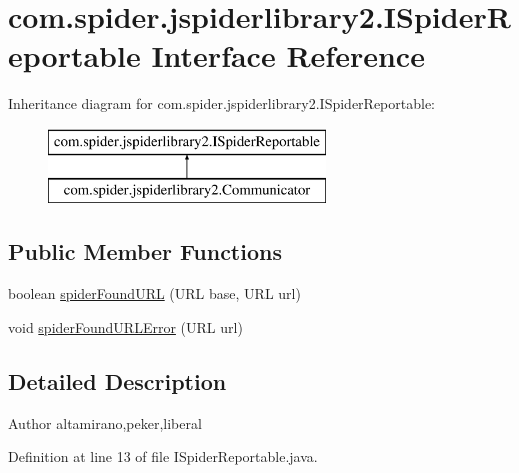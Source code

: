 \hypertarget{interfacecom_1_1spider_1_1jspiderlibrary2_1_1_i_spider_reportable}{\section{com.\-spider.\-jspiderlibrary2.\-I\-Spider\-Reportable \-Interface \-Reference}
\label{interfacecom_1_1spider_1_1jspiderlibrary2_1_1_i_spider_reportable}
}
\-Inheritance diagram for com.\-spider.\-jspiderlibrary2.\-I\-Spider\-Reportable\-:\begin{figure}[H]
\begin{center}
\leavevmode
\includegraphics[height=2.000000cm]{interfacecom_1_1spider_1_1jspiderlibrary2_1_1_i_spider_reportable}
\end{center}
\end{figure}
\subsection*{\-Public \-Member \-Functions}
\begin{DoxyCompactItemize}
\item 
boolean \hyperlink{interfacecom_1_1spider_1_1jspiderlibrary2_1_1_i_spider_reportable_a10fe4e486e6bd29efaa481e7532a84e3}{spider\-Found\-U\-R\-L} (\-U\-R\-L base, \-U\-R\-L url)
\item 
void \hyperlink{interfacecom_1_1spider_1_1jspiderlibrary2_1_1_i_spider_reportable_a73e089019826aba4f610eaa4974e6ad8}{spider\-Found\-U\-R\-L\-Error} (\-U\-R\-L url)
\end{DoxyCompactItemize}


\subsection{\-Detailed \-Description}
\begin{DoxyAuthor}{\-Author}
altamirano,peker,liberal 
\end{DoxyAuthor}


\-Definition at line 13 of file \-I\-Spider\-Reportable.\-java.



